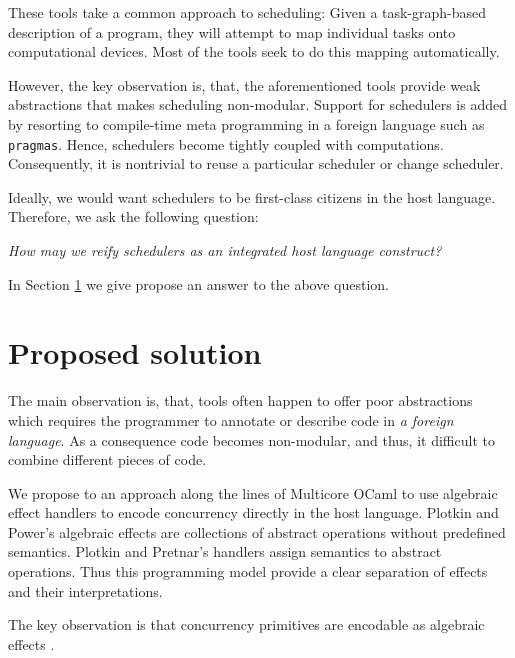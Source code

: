 \documentclass[preprint,10pt,numbers]{sigplanconf}
\begin{document}
These tools take a common approach to scheduling: Given a task-graph-based description of a program, they will attempt to map individual tasks onto computational devices. Most of the tools seek to do this mapping automatically.

However, the key observation is, that, the aforementioned tools provide weak abstractions that makes scheduling non-modular. Support for schedulers is added by resorting to compile-time meta programming in a foreign language such as \texttt{pragmas}. Hence, schedulers become tightly coupled with computations. Consequently, it is nontrivial to reuse a particular scheduler or change scheduler.

Ideally, we would want schedulers to be first-class citizens in the host language. Therefore, we ask the following question:
\begin{center}
  \emph{How may we reify schedulers as an integrated host language construct?}
\end{center}
In Section \ref{sec:proposedsolution} we give propose an answer to the above question.

  \section{Proposed solution}\label{sec:proposedsolution}
The main observation is, that, tools often happen to offer poor abstractions which requires the programmer to annotate or describe code in \emph{a foreign language}. As a consequence code becomes non-modular, and thus, it difficult to combine different pieces of code.

We propose to an approach along the lines of Multicore OCaml to use algebraic effect handlers to encode concurrency directly in the host language. Plotkin and Power's algebraic effects \cite{Plotkin2001} are collections of abstract operations without predefined semantics. Plotkin and Pretnar's handlers \cite{Plotkin2013} assign semantics to abstract operations. Thus this programming model provide a clear separation of effects and their interpretations.

The key observation is that concurrency primitives are encodable as algebraic effects \cite{Bauer2015,Dolan2015}. 
\end{document}
